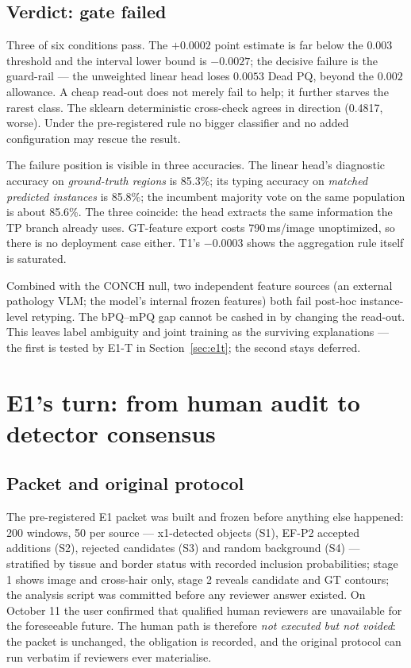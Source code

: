 \documentclass[11pt,a4paper]{article}
\begin{document}
\subsection{Verdict: gate failed}

Three of six conditions pass. The $+0.0002$ point estimate is far below the $0.003$ threshold and the interval lower bound is $-0.0027$; the decisive failure is the guard-rail --- the unweighted linear head loses $0.0053$ Dead PQ, beyond the $0.002$ allowance. A cheap read-out does not merely fail to help; it further starves the rarest class. The sklearn deterministic cross-check agrees in direction (0.4817, worse). Under the pre-registered rule no bigger classifier and no added configuration may rescue the result.

The failure position is visible in three accuracies. The linear head's diagnostic accuracy on \emph{ground-truth regions} is 85.3\%; its typing accuracy on \emph{matched predicted instances} is 85.8\%; the incumbent majority vote on the same population is about 85.6\%. The three coincide: the head extracts the same information the TP branch already uses. GT-feature export costs 790\,ms/image unoptimized, so there is no deployment case either. T1's $-0.0003$ shows the aggregation rule itself is saturated.

Combined with the CONCH null, two independent feature sources (an external pathology VLM; the model's internal frozen features) both fail post-hoc instance-level retyping. The bPQ--mPQ gap cannot be cashed in by changing the read-out. This leaves label ambiguity and joint training as the surviving explanations --- the first is tested by E1-T in Section~\ref{sec:e1t}; the second stays deferred.

\section{E1's turn: from human audit to detector consensus}\label{sec:e1}

\subsection{Packet and original protocol}

The pre-registered E1 packet\cite{specs} was built and frozen before anything else happened: 200 windows, 50 per source --- x1-detected objects (S1), EF-P2 accepted additions (S2), rejected candidates (S3) and random background (S4) --- stratified by tissue and border status with recorded inclusion probabilities; stage 1 shows image and cross-hair only, stage 2 reveals candidate and GT contours; the analysis script was committed before any reviewer answer existed. On October 11 the user confirmed that qualified human reviewers are unavailable for the foreseeable future. The human path is therefore \emph{not executed but not voided}: the packet is unchanged, the obligation is recorded, and the original protocol can run verbatim if reviewers ever materialise.
\end{document}
